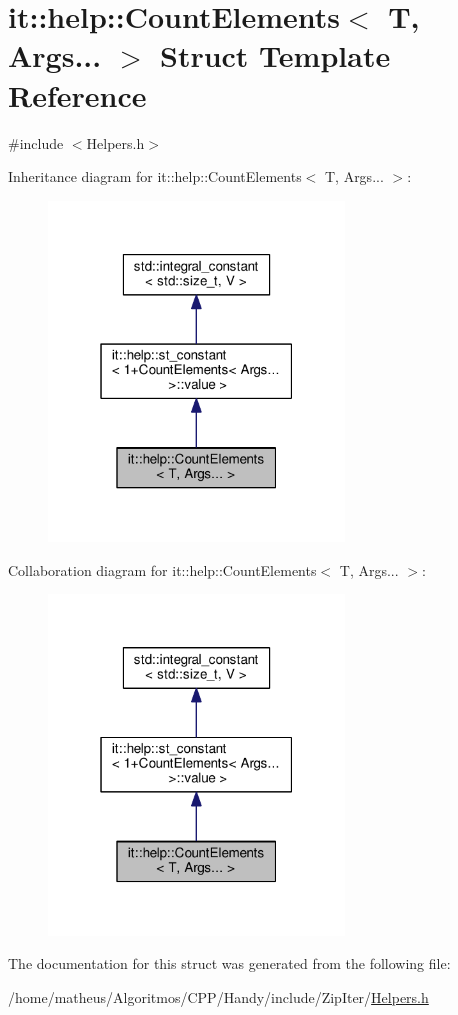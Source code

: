 \hypertarget{structit_1_1help_1_1CountElements_3_01T_00_01Args_8_8_8_01_4}{}\section{it\+:\+:help\+:\+:Count\+Elements$<$ T, Args... $>$ Struct Template Reference}
\label{structit_1_1help_1_1CountElements_3_01T_00_01Args_8_8_8_01_4}


{\ttfamily \#include $<$Helpers.\+h$>$}



Inheritance diagram for it\+:\+:help\+:\+:Count\+Elements$<$ T, Args... $>$\+:\nopagebreak
\begin{figure}[H]
\begin{center}
\leavevmode
\includegraphics[width=223pt]{structit_1_1help_1_1CountElements_3_01T_00_01Args_8_8_8_01_4__inherit__graph}
\end{center}
\end{figure}


Collaboration diagram for it\+:\+:help\+:\+:Count\+Elements$<$ T, Args... $>$\+:\nopagebreak
\begin{figure}[H]
\begin{center}
\leavevmode
\includegraphics[width=223pt]{structit_1_1help_1_1CountElements_3_01T_00_01Args_8_8_8_01_4__coll__graph}
\end{center}
\end{figure}


The documentation for this struct was generated from the following file\+:\begin{DoxyCompactItemize}
\item 
/home/matheus/\+Algoritmos/\+C\+P\+P/\+Handy/include/\+Zip\+Iter/\hyperlink{ZipIter_2Helpers_8h}{Helpers.\+h}\end{DoxyCompactItemize}
